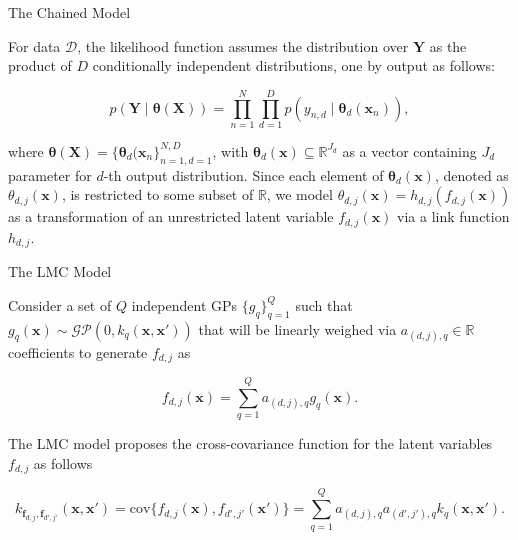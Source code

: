 \begin{frame}{The Chained Model}

\begin{block}{}
	For data $\mathcal{D}$, the likelihood function assumes the distribution over \(  \boldsymbol{Y} \) as the product of \( D \) conditionally independent distributions, one by output as follows:
\end{block}

\[
	p(\boldsymbol{Y} \mid \boldsymbol{\theta}(\boldsymbol{X})) = \prod_{n=1}^N \prod_{d=1}^D p\left(y_{n,d} \mid \boldsymbol{\theta}_d(\boldsymbol{x}_n)\right),
\]

\begin{block}{}
	where \( \boldsymbol{\theta}(\boldsymbol{X}) = \{ \boldsymbol{\theta}_d(\boldsymbol{x}_n \}_{n=1,d=1}^{N, D} \), with \( \boldsymbol{\theta}_d(\boldsymbol{x}) \subseteq \mathbb{R}^{J_d} \) as a vector containing \( J_d \) parameter for \( d \)-th output distribution. Since each element of \( \boldsymbol{\theta}_d(\boldsymbol{x}) \), denoted as \( \theta_{d,j}(\boldsymbol{x}) \), is restricted to some subset of \( \mathbb{R} \), we model \( \theta_{d,j}(\boldsymbol{x}) = h_{d,j}(f_{d,j}(\boldsymbol{x})) \) as a transformation of an unrestricted latent variable \( f_{d,j}(\boldsymbol{x}) \) via a link function \( h_{d,j} \).
\end{block}

\end{frame}

\begin{frame}{The LMC Model}
	
\begin{block}{}
	Consider a set of \( Q \) independent GPs \( \{ g_q \}_{q=1}^Q \) such that \( g_q(\boldsymbol{x}) \sim \mathcal{GP}(0, k_q(\boldsymbol{x}, \boldsymbol{x}'))\) that will be linearly weighed via \( a_{(d,j),q} \in \mathbb{R} \) coefficients to generate \( f_{d,j} \) as
\end{block}	


\[
	f_{d,j}(\boldsymbol{x}) = \sum_{q=1}^Q a_{(d,j),q} g_{q}(\boldsymbol{x}).
\]

\begin{block}{}
	The LMC model proposes the cross-covariance function for the latent variables \( f_{d,j} \) as follows
\end{block}
 
\[
	k_{\boldsymbol{f}_{d,j}, \boldsymbol{f}_{d',j'}}(\boldsymbol{x}, \boldsymbol{x}') = \text{cov}\{f_{d,j}(\boldsymbol{x}), f_{d',j'}(\boldsymbol{x}')\}
	=\sum_{q=1}^Q a_{(d,j),q}a_{(d',j'),q} k_{q}(\boldsymbol{x}, \boldsymbol{x}').
\]

\end{frame}


